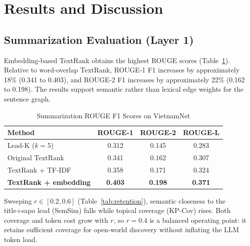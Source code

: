 \section{Results and Discussion}
\label{sec:results}

\subsection{Summarization Evaluation (Layer 1)}
Embedding-based TextRank obtains the highest ROUGE scores
(Table~\ref{tab:rouge}). Relative to word-overlap TextRank, ROUGE-1 F1 increases by
approximately 18\% (0.341 to 0.403), and ROUGE-2 F1 increases by approximately
22\% (0.162 to 0.198). The results support semantic rather than lexical edge
weights for the sentence graph.

\begin{table}[!t]
\renewcommand{\arraystretch}{1.2}
\caption{Summarization ROUGE F1 Scores on VietnamNet}
\label{tab:rouge}
\centering
\footnotesize
\begin{tabularx}{\columnwidth}{@{}Xccc@{}}
\toprule
\textbf{Method} & \textbf{ROUGE-1} & \textbf{ROUGE-2} & \textbf{ROUGE-L} \\
\midrule
Lead-K ($k=5$)              & 0.312 & 0.145 & 0.283 \\
Original TextRank           & 0.341 & 0.162 & 0.307 \\
TextRank + TF-IDF           & 0.358 & 0.171 & 0.324 \\
\textbf{TextRank + embedding}   & \textbf{0.403} & \textbf{0.198} & \textbf{0.371} \\
\bottomrule
\end{tabularx}
\end{table}

Sweeping $r\in[0.2,0.6]$ (Table~\ref{tab:retention}), semantic closeness to the title+sapo lead (SemSim) falls while topical coverage (KP-Cov) rises. Both coverage and token cost grow with $r$, so $r=0.4$ is a balanced operating point: it retains sufficient coverage for open-world discovery without inflating the LLM token load.


